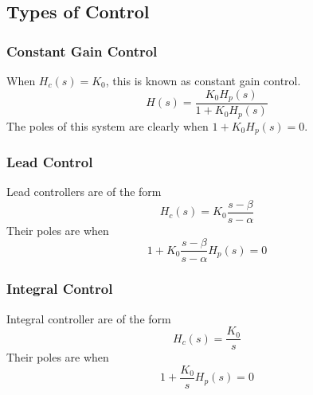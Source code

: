 \subsection{Types of Control}
\subsubsection{Constant Gain Control}
When $H_c(s) = K_0$, this is known as constant gain control.
$$H(s) = \frac{K_0H_p(s)}{1+K_0H_p(s)}$$
The poles of this system are clearly when $1+K_0H_p(s)=0$.
\subsubsection{Lead Control}
Lead controllers are of the form
$$H_c(s) = K_0\frac{s-\beta}{s-\alpha}$$
Their poles are when
$$1 + K_0\frac{s-\beta}{s-\alpha}H_p(s) = 0$$
\subsubsection{Integral Control}
Integral controller are of the form
$$H_c(s) = \frac{K_0}{s}$$
Their poles are when 
$$1 + \frac{K_0}{s}H_p(s) = 0$$
